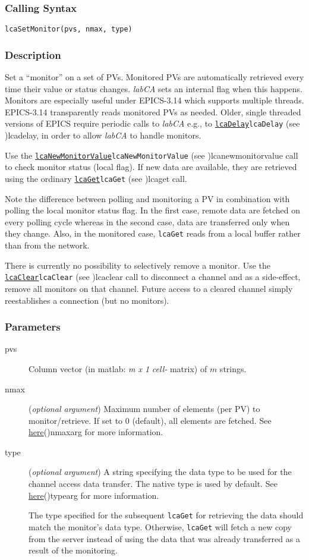 \documentclass{article}
\newcommand{\sca}{\ita{labCA}}
\newcommand{\com}[1]{{\tt #1}}
\newcommand{\comref}[2]{\hyperref[ref]{\com{#1}}{\com{#1} (see }{)}{#2}}
\newcommand{\ita}[1]{\emph{#1}}
\newcommand{\m}{$m$}
\newcommand{\mhack}{$m$} %
\newcommand{\mxl}{$m\times 1$}
\renewcommand{\m}{\ita{m}}
\newcommand{\mhack}{\ita{m}} %
\renewcommand{\mxl}{\ita{m x 1}}
\newcommand{\PVITEM}{
\item[pvs] Column vector (in matlab: \mxl{} \ita{cell-} matrix)
of \mhack{} strings.
}
\begin{document}
\subsubsection{Calling Syntax}
\begin{verbatim}
lcaSetMonitor(pvs, nmax, type)
\end{verbatim}
\subsubsection{Description}
Set a ``monitor'' on a set of PVs. Monitored PVs are automatically retrieved
every time their value or status changes. \sca{} sets an internal flag when
this happens. Monitors are especially useful under EPICS-3.14 which supports
multiple threads. EPICS-3.14 transparently reads monitored PVs as needed.
Older, single threaded versions of EPICS require periodic calls to \sca{}
e.g., to \comref{lcaDelay}{lcadelay}, in order to allow \sca{} to handle
monitors.

Use the \comref{lcaNewMonitorValue}{lcanewmonitorvalue} call to check
monitor status (local flag). If new data are available, they are retrieved using
the ordinary \comref{lcaGet}{lcaget} call.

Note the difference between polling and monitoring a PV in combination with
polling the local monitor status flag. In the first case, remote data are fetched
on every polling cycle whereas in the second case, data are transferred only
when they change.  Also, in the monitored case, \com{lcaGet} reads from a local
buffer rather than from the network.

There is currently no possibility to selectively remove a monitor. Use
the \comref{lcaClear}{lcaclear} call to disconnect a channel and as a side-effect,
remove all monitors on that channel. Future access to a cleared channel
simply reestablishes a connection (but no monitors).
\subsubsection{Parameters}
\begin{description}
\PVITEM
\item[nmax]
(\ita{optional argument}) Maximum number of elements
(per PV) to monitor/retrieve. If set to 0 (default), all elements are fetched.
See \hyperref[ref]{here}{(}{)}{nmaxarg} for more information.
\item[type]
(\ita{optional argument}) A string specifying the
data type to be used for the channel access data transfer. The
native type is used by default.
See \hyperref[ref]{here}{(}{)}{typearg} for more information.

The type specified for the subsequent \com{lcaGet} for retrieving
the data should match the monitor's data type. Otherwise, \com{lcaGet}
will fetch a new copy from the server instead of using the data that
was already transferred as a result of the monitoring.
\end{description}
\end{document}
